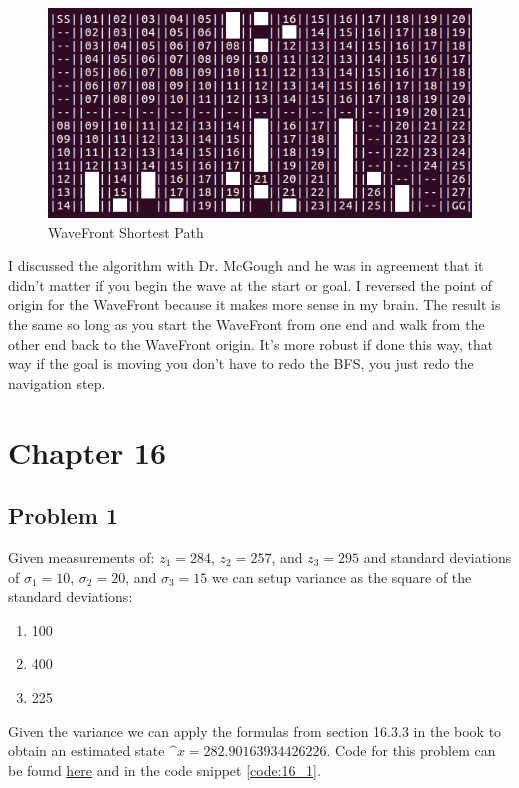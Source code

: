 \documentclass{article}
\begin{document}
\begin{figure}[h]
    \centering
    \includegraphics[scale=2.5]{problem11_3_2}
    \caption{WaveFront Shortest Path}
    \label{fig:p11_3_2}
\end{figure}

I discussed the algorithm with Dr. McGough and he was in agreement that it 
didn't matter if you begin the wave at the start or goal. I reversed the point 
of origin for the WaveFront because it makes more sense in my brain. The result 
is the same so long as you start the WaveFront from one end and walk from the 
other end back to the WaveFront origin. It's more robust if done this way, that 
way if the goal is moving you don't have to redo the BFS, you just redo the 
navigation step.


\newpage
\section{\textbf{Chapter 16}}
\subsection{Problem 1}
Given measurements of: $z_1 = 284$, $z_2 = 257$, and $z_3 = 295$ and standard 
deviations of $\sigma_1 = 10$, $\sigma_2 = 20$, and $\sigma_3 = 15$ we can setup 
variance as the square of the standard deviations:

\begin{enumerate}
    \item 100
    \item 400
    \item 225
\end{enumerate}

Given the variance we can apply the formulas from section 16.3.3 in the book to 
obtain an estimated state $\^{x} = 282.90163934426226$. Code for this problem 
can be found 
\href{https://github.com/macattackftw/RoboticsHW/blob/master/HW5/problem16_1.py}{here} 
and in the code snippet \ref{code:16_1}.
\end{document}
